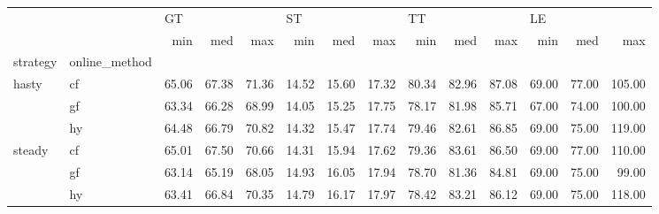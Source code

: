 \begin{tabular}{llrrrrrrrrrrrr}
\toprule
       &    & \multicolumn{3}{l}{GT} & \multicolumn{3}{l}{ST} & \multicolumn{3}{l}{TT} & \multicolumn{3}{l}{LE} \\
       &    &   min &   med &   max &   min &   med &   max &   min &   med &   max &   min &   med &    max \\
strategy & online\_method &       &       &       &       &       &       &       &       &       &       &       &        \\
\midrule
hasty & cf & 65.06 & 67.38 & 71.36 & 14.52 & 15.60 & 17.32 & 80.34 & 82.96 & 87.08 & 69.00 & 77.00 & 105.00 \\
       & gf & 63.34 & 66.28 & 68.99 & 14.05 & 15.25 & 17.75 & 78.17 & 81.98 & 85.71 & 67.00 & 74.00 & 100.00 \\
       & hy & 64.48 & 66.79 & 70.82 & 14.32 & 15.47 & 17.74 & 79.46 & 82.61 & 86.85 & 69.00 & 75.00 & 119.00 \\
steady & cf & 65.01 & 67.50 & 70.66 & 14.31 & 15.94 & 17.62 & 79.36 & 83.61 & 86.50 & 69.00 & 77.00 & 110.00 \\
       & gf & 63.14 & 65.19 & 68.05 & 14.93 & 16.05 & 17.94 & 78.70 & 81.36 & 84.81 & 69.00 & 75.00 &  99.00 \\
       & hy & 63.41 & 66.84 & 70.35 & 14.79 & 16.17 & 17.97 & 78.42 & 83.21 & 86.12 & 69.00 & 75.00 & 118.00 \\
\bottomrule
\end{tabular}
